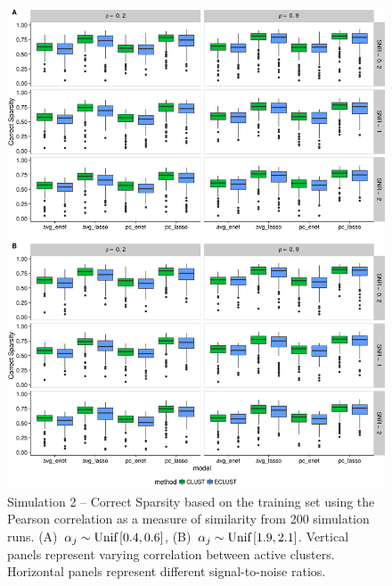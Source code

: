\begin{figure}[H]
	\centering
	\includegraphics[scale=0.55, keepaspectratio]{./figs/hydra/results/figures/sim2-sept8/CorrectSparsity_Correlation_sim2.png}
	\caption{Simulation 2 -- Correct Sparsity based on the training set using the Pearson correlation as a measure of similarity from 200 simulation runs. \mbox{(A) $\alpha_{j} \sim \textrm{{Unif}}\left[0.4, 0.6\right]$}, \mbox{(B) $\alpha_{j} \sim \textrm{{Unif}}\left[1.9, 2.1\right]$}. Vertical panels represent varying correlation between active clusters. Horizontal panels represent different signal-to-noise ratios.}
	\label{fig:CorrectSparsity_Correlation_sim2}
\end{figure}


